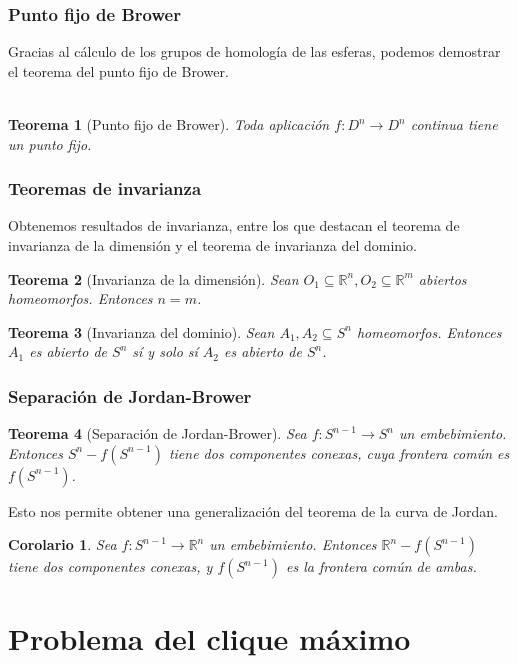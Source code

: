 \documentclass{beamer}
\def\R{{\mathbb R}}
\theoremstyle{theorem}
\newtheorem{mytheorem}{Teorema}
\newtheorem{mycorollary}{Corolario}
\begin{document}
\begin{frame}
  \frametitle{Punto fijo de Brower}
  Gracias al cálculo de los grupos de homología de las esferas, podemos demostrar el teorema del punto fijo de Brower. \\~\\

  \begin{mytheorem}[Punto fijo de Brower]
    Toda aplicación $f \colon D^n \to D^n$ continua tiene un punto fijo.
  \end{mytheorem}
\end{frame}

\begin{frame}
  \frametitle{Teoremas de invarianza}
  Obtenemos resultados de invarianza, entre los que destacan el teorema de invarianza de la dimensión y
  el teorema de invarianza del dominio.

  \begin{mytheorem}[Invarianza de la dimensión]
    Sean $O_1 \subseteq \R^n, O_2 \subseteq \R^m$ abiertos homeomorfos. Entonces $n = m$.
  \end{mytheorem}

  \begin{mytheorem}[Invarianza del dominio]
    Sean $A_1, A_2 \subseteq S^n$ homeomorfos. Entonces $A_1$ es abierto de $S^n$ sí y solo sí $A_2$ es abierto de $S^n$.
  \end{mytheorem}
\end{frame}

\begin{frame}
  \frametitle{Separación de Jordan-Brower}
  \begin{mytheorem}[Separación de Jordan-Brower]
    Sea $f \colon S^{n-1} \to S^n$ un embebimiento. Entonces $S^n - f(S^{n-1})$ tiene dos componentes conexas,
    cuya frontera común es $f(S^{n-1})$.
  \end{mytheorem}

  Esto nos permite obtener una generalización del teorema de la curva de Jordan.

  \begin{mycorollary}
    Sea $f \colon S^{n-1} \to \R^n$ un embebimiento. Entonces $\R^n - f(S^{n-1})$ tiene dos componentes conexas,
    y $f(S^{n-1})$ es la frontera común de ambas.
  \end{mycorollary}
\end{frame}


\section{Problema del clique máximo}
\end{document}
